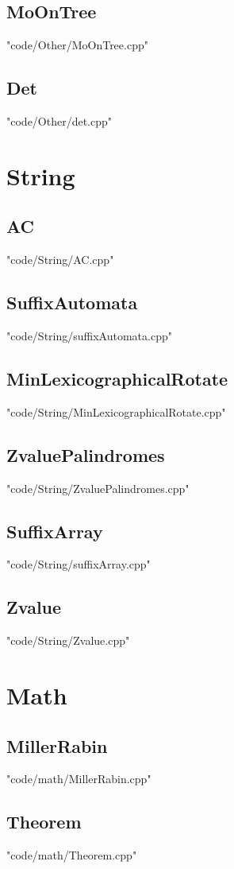\documentclass [8pt,a4paper,twocolumn]{article}
\begin{document}
\subsection{MoOnTree}
 {"code/Other/MoOnTree.cpp"}
\subsection{Det}
 {"code/Other/det.cpp"}
\section{String}
\subsection{AC}
 {"code/String/AC.cpp"}
\subsection{SuffixAutomata}
 {"code/String/suffixAutomata.cpp"}
\subsection{MinLexicographicalRotate}
 {"code/String/MinLexicographicalRotate.cpp"}
\subsection{ZvaluePalindromes}
 {"code/String/ZvaluePalindromes.cpp"}
\subsection{SuffixArray}
 {"code/String/suffixArray.cpp"}
\subsection{Zvalue}
 {"code/String/Zvalue.cpp"}
\section{Math}
\subsection{MillerRabin}
 {"code/math/MillerRabin.cpp"}
\subsection{Theorem}
 {"code/math/Theorem.cpp"}
\end{document}

